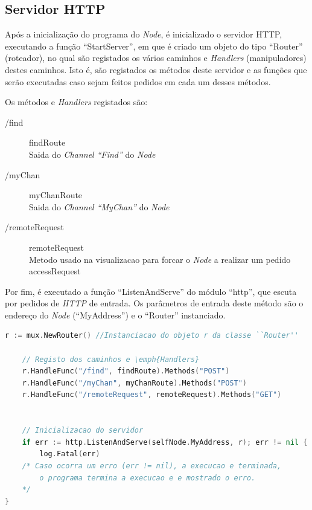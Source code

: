 
\subsection*{Servidor \acs{HTTP}}
\label{implementacao:sec:servidor_http}
Após a inicialização do programa do \emph{Node}, é inicializado o servidor \acs{HTTP}, executando a função ``StartServer'', em que é criado um objeto do tipo ``Router'' (roteador),  
no qual são registados os vários caminhos e \emph{Handlers}
(manipuladores) destes caminhos. Isto é, são registados os métodos deste servidor e as funções que serão executadas
caso sejam feitos pedidos em cada um desses métodos.

Os métodos e \emph{Handlers} registados são:


\begin{description}
	\item [/find] findRoute \\ Saida do \emph{Channel ``Find''} do \emph{Node}
	\item [/myChan] myChanRoute \\ Saida do \emph{Channel ``MyChan''} do \emph{Node}
	\item [/remoteRequest] remoteRequest \\ Metodo usado na visualizacao para forcar o \emph{Node} a realizar um pedido accessRequest
\end{description}

Por fim, é executado a função ``ListenAndServe'' do módulo ``http'', que escuta por pedidos de \emph{HTTP} de entrada.
Os parâmetros de entrada deste método são o endereço do \emph{Node} (``MyAddress'') e o ``Router'' instanciado.


\begin{lstlisting}[caption={Instanciacão e inicialização do servidor \acs{HTTP}},language=Go]
	r := mux.NewRouter() //Instanciacao do objeto r da classe ``Router''

	// Registo dos caminhos e \emph{Handlers}
	r.HandleFunc("/find", findRoute).Methods("POST")
	r.HandleFunc("/myChan", myChanRoute).Methods("POST")
	r.HandleFunc("/remoteRequest", remoteRequest).Methods("GET")


	// Inicializacao do servidor
	if err := http.ListenAndServe(selfNode.MyAddress, r); err != nil {
		log.Fatal(err) 				
	/* Caso ocorra um erro (err != nil), a execucao e terminada, 
		o programa termina a execucao e e mostrado o erro.
	*/
}
\end{lstlisting}




